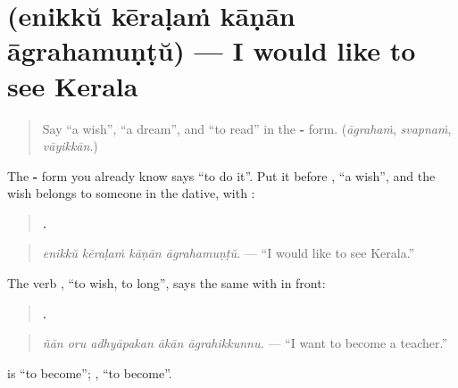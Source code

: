 \section[\texorpdfstring{\ml{എനിക്ക്} \ml{കേരളം} … (enikkŭ kēraḷaṁ …)}{എനിക്ക് കേരളം … (enikkŭ kēraḷaṁ …)}]{    (enikkŭ kēraḷaṁ kāṇān āgrahamuṇṭŭ) — I would like to see Kerala}

\label{lesson:ML-C345-kanan-agrahamundu}



\begin{quote}
Say \textquotedblleft{}a wish\textquotedblright{}, \textquotedblleft{}a dream\textquotedblright{}, and \textquotedblleft{}to read\textquotedblright{} in the \textbf{-} form. (\emph{āgrahaṁ}, \emph{svapnaṁ}, \emph{vāyikkān}.)
\end{quote}

\begin{grammarlens}[title={Grammar Lens: -\ml{ആൻ} \ml{ആഗ്രഹമുണ്ട്}}]
The \textbf{-} form you already know says \textquotedblleft{}to do it\textquotedblright{}. Put it before \textbf{}, \textquotedblleft{}a wish\textquotedblright{}, and the wish belongs to someone in the dative, with \textbf{}:

\begin{quote}
\textbf{   .}
\end{quote}

\begin{quote}
\emph{enikkŭ kēraḷaṁ kāṇān āgrahamuṇṭŭ.} — \textquotedblleft{}I would like to see Kerala.\textquotedblright{}
\end{quote}

The verb \textbf{}, \textquotedblleft{}to wish, to long\textquotedblright{}, says the same with \textbf{} in front:

\begin{quote}
\textbf{    .}
\end{quote}

\begin{quote}
\emph{ñān oru adhyāpakan ākān āgrahikkunnu.} — \textquotedblleft{}I want to become a teacher.\textquotedblright{}
\end{quote}

\textbf{} is \textquotedblleft{}to become\textquotedblright{}; \textbf{}, \textquotedblleft{}to become\textquotedblright{}.
\end{grammarlens}

